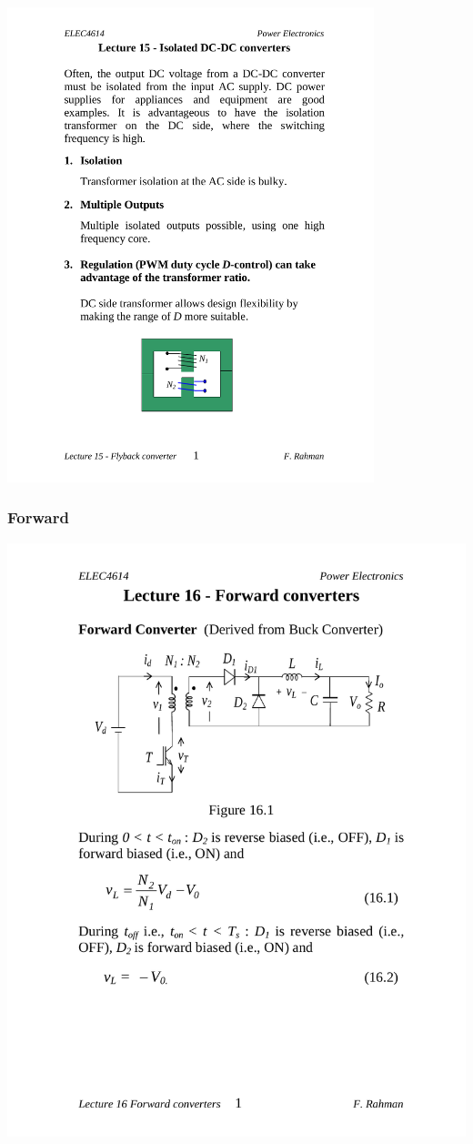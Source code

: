 \begin{center}
\includegraphics[page=5, 
                     clip, 
                     trim=4cm 9.5cm 3cm 11cm, 
                     width=0.8\textwidth]
                     {5/figures/flyback.pdf} 
\end{center}

\subsubsection*{Forward}

\begin{center}
\includegraphics[page=4, clip, trim=4cm 15cm 2.5cm 7.5cm, scale=0.7]{5/figures/forward.pdf}
\end{center}

